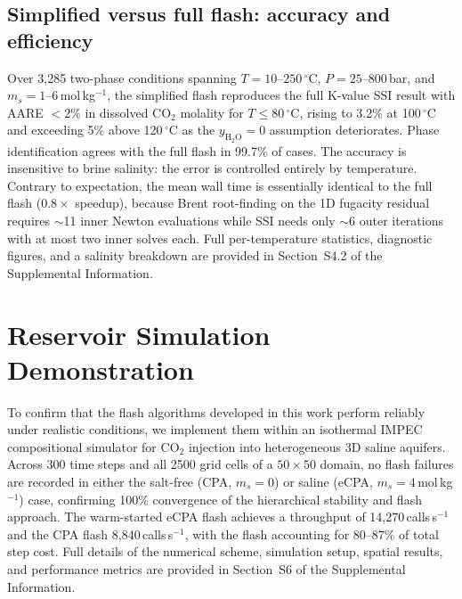 \documentclass[preprint,12pt,number]{elsarticle}
\begin{document}
\subsection{Simplified versus full flash: accuracy and efficiency}
\label{sec:simplified_perf}

Over 3{,}285 two-phase conditions spanning $T = 10$--$250\,^\circ$C,
$P = 25$--$800$\,bar, and $m_s = 1$--$6$\,mol\,kg$^{-1}$, the simplified flash
reproduces the full K-value SSI result with AARE $< 2\%$ in dissolved CO$_2$ molality
for $T \leq 80\,^\circ$C, rising to 3.2\% at 100\,$^\circ$C and exceeding 5\% above
120\,$^\circ$C as the $y_{\text{H}_2\text{O}} = 0$ assumption deteriorates.
Phase identification agrees with the full flash in 99.7\% of cases.
The accuracy is insensitive to brine salinity: the error is controlled entirely by
temperature.
Contrary to expectation, the mean wall time is essentially identical to the full flash
($0.8\times$ speedup), because Brent root-finding on the 1D fugacity residual requires
$\sim$11 inner Newton evaluations while SSI needs only $\sim$6 outer iterations with at
most two inner solves each.
Full per-temperature statistics, diagnostic figures, and a salinity breakdown are
provided in Section~S4.2 of the Supplemental Information.

\section{Reservoir Simulation Demonstration}
\label{sec:simulator}

To confirm that the flash algorithms developed in this work perform reliably under
realistic conditions, we implement them within an isothermal IMPEC compositional
simulator for CO$_2$ injection into heterogeneous 3D saline aquifers.
Across 300 time steps and all 2500 grid cells of a $50\times50$ domain, no flash
failures are recorded in either the salt-free (CPA, $m_s = 0$) or saline
(eCPA, $m_s = 4$\,mol\,kg$^{-1}$) case, confirming 100\% convergence of the
hierarchical stability and flash approach.
The warm-started eCPA flash achieves a throughput of 14{,}270\,calls\,s$^{-1}$ and
the CPA flash 8{,}840\,calls\,s$^{-1}$, with the flash accounting for 80--87\% of
total step cost.
Full details of the numerical scheme, simulation setup, spatial results, and
performance metrics are provided in Section~S6 of the Supplemental Information.
\end{document}
